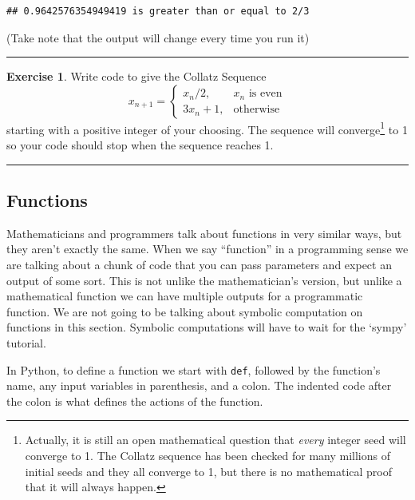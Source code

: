 \documentclass[
]{book}
\theoremstyle{definition}
\theoremstyle{definition}
\theoremstyle{definition}
\newtheorem{exercise}{Exercise}[chapter]
\theoremstyle{remark}
\begin{document}
\begin{verbatim}
## 0.9642576354949419 is greater than or equal to 2/3
\end{verbatim}

(Take note that the output will change every time you run it)

\begin{center}\rule{0.5\linewidth}{0.5pt}\end{center}

\begin{exercise}
\protect\hypertarget{exr:unnamed-chunk-679}{}{\label{exr:unnamed-chunk-679} }Write code to give the Collatz Sequence
\[x_{n+1} = \left\{ \begin{array}{ll} x_n / 2, & \text{$x_n$ is even} \\ 3 x_n + 1, & \text{otherwise} \end{array} \right.\]
starting with a positive integer of your choosing. The sequence will converge\footnote{Actually, it is still an open mathematical question that \emph{every} integer seed will converge to 1. The Collatz sequence has been checked for many millions of initial seeds and they all converge to 1, but there is no mathematical proof that it will always happen.} to 1 so your code should stop when the sequence reaches 1.
\end{exercise}

\begin{center}\rule{0.5\linewidth}{0.5pt}\end{center}

\hypertarget{functions}{%
\subsection{Functions}\label{functions}}

Mathematicians and programmers talk about functions in very similar ways, but they aren't exactly the same. When we say ``function'' in a programming sense we are talking about a chunk of code that you can pass parameters and expect an output of some sort. This is not unlike the mathematician's version, but unlike a mathematical function we can have multiple outputs for a programmatic function. We are not going to be talking about symbolic computation on functions in this section. Symbolic computations will have to wait for the `sympy' tutorial.

In Python, to define a function we start with \texttt{def}, followed by the function's name, any input variables in parenthesis, and a colon. The indented code after the colon is what defines the actions of the function.
\end{document}
